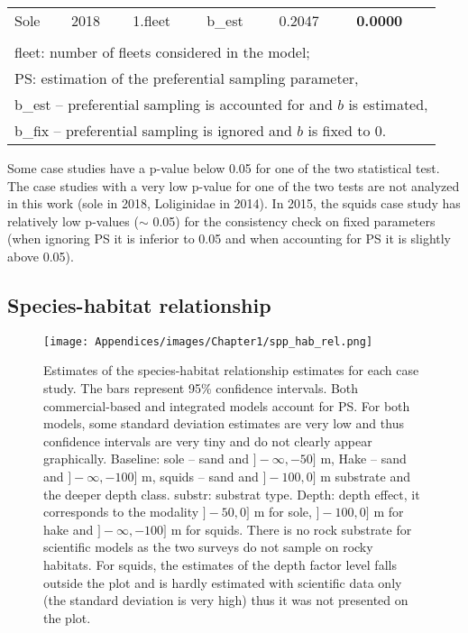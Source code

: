 \begin{center}
\begin{longtable}{llllll}
Sole    & 2018 & 1.fleet  & b\_est & 0.2047                                              & {\cellcolor[rgb]{0.753,0.753,0.753}}\textbf{0.0000} \\ \\
\multicolumn{6}{l}{fleet: number of fleets considered in the model;} \\
\multicolumn{6}{l}{PS: estimation of the preferential sampling parameter,} \\
\multicolumn{6}{l}{b_est – preferential sampling is accounted for and $b$ is estimated,} \\
\multicolumn{6}{l}{b_fix – preferential sampling is ignored and $b$ is fixed to 0.}

\end{longtable}
\end{center}

Some case studies have a p-value below 0.05 for one of the two statistical test. The case studies with a very low p-value for one of the two tests are not analyzed in this work (sole in 2018, Loliginidae in 2014). In 2015, the squids case study has relatively low p-values (\(\sim\) 0.05) for the consistency check on fixed parameters (when ignoring PS it is inferior to 0.05 and when accounting for PS it is slightly above 0.05).


\subsection{Species-habitat relationship}\label{appendix:SppHabRel}

\begin{figure}[H]
   \begin{center}
      \texttt{[image: Appendices/images/Chapter1/spp\_hab\_rel.png]}
   \end{center}
   \caption[Estimates of the species-habitat relationship estimates for each case study. The bars represent 95\% confidence intervals. ]
   {Estimates of the species-habitat relationship estimates for each case study. The bars represent 95\% confidence intervals. Both commercial-based and integrated models account for PS. For both models, some standard deviation estimates are very low and thus confidence intervals are very tiny and do not clearly appear graphically. Baseline: sole – sand and $]-\infty,-50]$ m, Hake – sand and $]-\infty,-100]$ m, squids – sand and $]-100,0]$ m substrate and the deeper depth class. substr: substrat type.  Depth: depth effect, it corresponds to the modality $]-50,0]$ m for sole, $]-100,0]$ m for hake and $]-\infty,-100]$ m for squids. There is no rock substrate for scientific models as the two surveys do not sample on rocky habitats. For squids, the estimates of the depth factor level falls outside the plot and is hardly estimated with scientific data only (the standard deviation is very high) thus it was not presented on the plot.}
   \label{fig:SppHabRel}
\end{figure}

